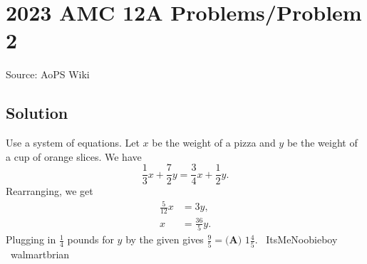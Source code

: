 \documentclass[12pt]{article}
\begin{document}
\section*{{2023 AMC 12A Problems/Problem 2}}
Source: AoPS Wiki

\subsection*{Solution}
Use a system of equations. Let $x$ be the weight of a pizza and $y$ be the weight of a cup of orange slices.
We have \[\frac{1}{3}x+\frac{7}{2}y=\frac{3}{4}x+\frac{1}{2}y.\] Rearranging, we get \begin{align*} \frac{5}{12}x&=3y, \\ x&=\frac{36}{5}y. \end{align*} Plugging in $\frac{1}{4}$ pounds for $y$ by the given gives $\frac{9}{5}=\boxed{\textbf{(A) }1\frac{4}{5}}.$ ~ItsMeNoobieboy
~walmartbrian
\end{document}
